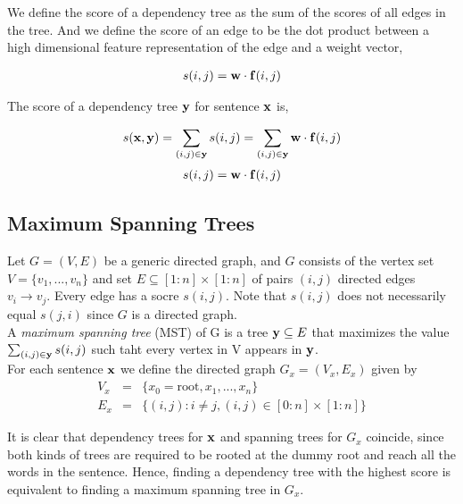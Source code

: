 \documentclass[12pt]{article}
\begin{document}
We define the score of a dependency tree as the sum of the scores of all edges in the tree. And we define the score of an edge to be the dot product between a high dimensional feature representation of the edge and a weight vector,

\begin{eqnarray*}
s(i,j) = {\bf w} \cdot {\bf f}(i,j)
\end{eqnarray*}

The score of a dependency tree ${\bf y}$ for sentence ${\bf x}$ is,

\begin{eqnarray*}
s({\bf x}, {\bf y})
= \sum_{(i,j) \in {\bf y}} s(i,j)
= \sum_{(i,j) \in {\bf y}} {\bf w} \cdot {\bf f}(i,j)
\end{eqnarray*}
\begin{eqnarray*}
s(i,j) = {\bf w} \cdot {\bf f}(i,j)
\end{eqnarray*}

\subsection{Maximum Spanning Trees}

Let $G = (V,E)$ be a generic directed graph, and $G$ consists of the vertex set $V = \{ v_1,...,v_n \}$ and set $E \subseteq [1:n] \times [1:n]$ of pairs $(i,j)$ directed edges $v_i \rightarrow v_j$. Every edge has a socre $s(i,j)$. Note that $s(i,j)$ does not necessarily equal $s(j,i)$ since $G$ is a directed graph. \\

A \emph {maximum spanning tree} (MST) of G is a tree ${\bf y} \subseteq E$ that maximizes the value $\sum_{(i,j) \in {\bf y}} s(i,j)$ such taht every vertex in V appears in ${\bf y}$. \\

For each sentence ${\bf x}$ we define the directed graph $G_x = (V_x, E_x)$ given by
\begin{eqnarray*}
V_x &=& \{ x_0 = \text{root}, x_1,...,x_n \} \\
E_x &=& \{ (i,j): i \neq j, (i,j) \in [0:n] \times [1:n] \}
\end{eqnarray*}

It is clear that dependency trees for ${\bf x}$ and spanning trees for $G_x$ coincide, since both kinds of trees are required to be rooted at the dummy root and reach all the words in the sentence. Hence, finding a dependency tree with the highest score is equivalent to finding a maximum spanning tree in $G_x$.
\end{document}
